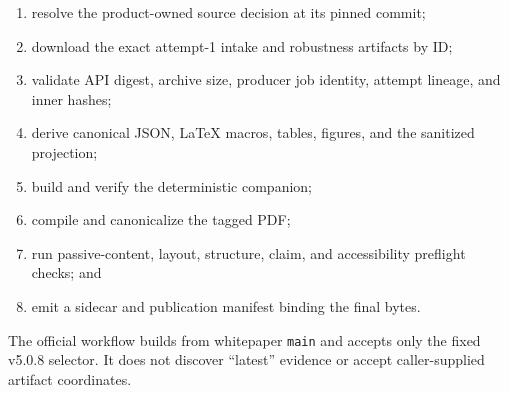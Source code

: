 \begin{enumerate}
  \item resolve the product-owned source decision at its pinned commit;
  \item download the exact attempt-1 intake and robustness artifacts by ID;
  \item validate API digest, archive size, producer job identity, attempt lineage, and inner hashes;
  \item derive canonical JSON, LaTeX macros, tables, figures, and the sanitized projection;
  \item build and verify the deterministic companion;
  \item compile and canonicalize the tagged PDF;
  \item run passive-content, layout, structure, claim, and accessibility preflight checks; and
  \item emit a sidecar and publication manifest binding the final bytes.
\end{enumerate}

The official workflow builds from whitepaper \texttt{main} and accepts only the fixed v5.0.8
selector. It does not discover ``latest'' evidence or accept caller-supplied artifact coordinates.
